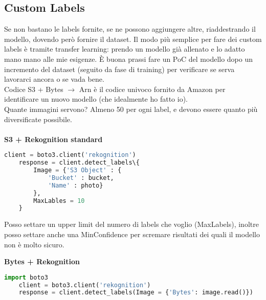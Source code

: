 \documentclass{classes/base}
\begin{document}
    \subsection*{Custom Labels}
    Se non bastano le labels fornite, se ne possono aggiungere altre, riaddestrando il modello, dovendo però fornire il dataset.
    Il modo più semplice per fare dei custom labels è tramite transfer learning: prendo un modello già allenato e lo adatto mano mano alle mie esigenze.
    È buona prassi fare un PoC del modello dopo un incremento del dataset (seguito da fase di training) per verificare se serva lavorarci ancora o se vada bene.\\
    Codice S3 + Bytes $\rightarrow$ Arn è il codice univoco fornito da Amazon per identificare un nuovo modello (che idealmente ho fatto io). \\
    Quante immagini servono? Almeno 50 per ogni label, e devono essere quanto più diversificate possibile. \\ \\
    \textbf{S3 + Rekognition standard} \\
    \begin{lstlisting}[language=Python]
    client = boto3.client('rekognition')
    response = client.detect_labels\{
        Image = {'S3 Object' : {
            'Bucket' : bucket,
            'Name' : photo}
        },
        MaxLables = 10
    }
    \end{lstlisting}
    Posso settare un upper limit del numero di labels che voglio (MaxLabels), inoltre posso settare anche una MinConfidence per scremare risultati dei quali il modello non è molto sicuro.
    \newpage

    \textbf{Bytes + Rekognition} \\
    \begin{lstlisting}[language=Python]
    import boto3
    client = boto3.client('rekognition')
    response = client.detect_labels(Image = {'Bytes': image.read()})
    \end{lstlisting}
\end{document}
